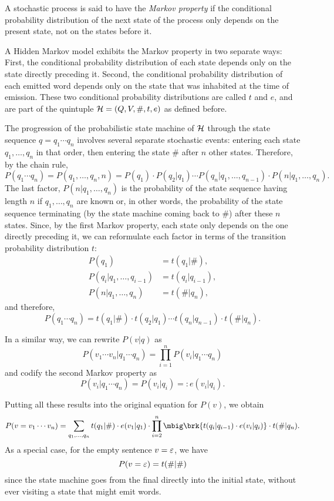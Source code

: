 \begin{definition}
 A stochastic process is said to have the \emph{Markov property} if the
 conditional probability distribution of the next state of the process only
 depends on the present state, not on the states before it.
\end{definition}

A Hidden Markov model exhibits the Markov property in two separate ways: First,
the conditional probability distribution of each state depends only on the
state directly preceding it. Second, the conditional probability distribution
of each emitted word depends only on the state that was inhabited at the time
of emission. These two conditional probability distributions are called $t$ and
$e$, and are part of the quintuple $\mathcal H=(Q,V,\#,t,e)$ as defined before.

The progression of the probabilistic state machine of $\mathcal H$ through the state
sequence $q=q_1\cdots q_n$ involves several separate stochastic events:
entering each state $q_1,\ldots,q_n$ in that order, then entering the state
$\#$ after $n$ other states. Therefore, by the chain rule,
\[
 P(q_1\cdots q_n) = P(q_1,\ldots,q_n,n) = P(q_1) \cdot P(q_2|q_1) \cdots P(q_n|q_1,\ldots,q_{n-1}) \cdot P(n|q_1,\ldots,q_n).
\]
The last factor, $P(n|q_1,\ldots,q_n)$ is the probability of the state sequence
having length $n$ if $q_1,\ldots,q_n$ are known or, in other words, the
probability of the state sequence terminating (by the state machine coming back
to $\#$) after these $n$ states. Since, by the first Markov property, each
state only depends on the one directly preceding it, we can reformulate each
factor in terms of the transition probability distribution $t$:
\begin{align*}
 P(q_1) &= t(q_1|\#), \\
 P(q_i|q_1,\ldots,q_{i-1}) &= t(q_i|q_{i-1}), \\
 P(n|q_1,\ldots,q_n) &= t(\#|q_n),
\end{align*}
and therefore,
\[
 P(q_1\cdots q_n) = t(q_1|\#) \cdot t(q_2|q_1) \cdots t(q_n|q_{n-1}) \cdot t(\#|q_n).
\]

In a similar way, we can rewrite $P(v|q)$ as
\[
 P(v_1\cdots v_n|q_1\cdots q_n) = \prod_{i=1}^n P(v_i|q_1\cdots q_n)
\]
and codify the second Markov property as
\[
 P(v_i|q_1\cdots q_n) = P(v_i|q_i) =: e(v_i|q_i).
\]

Putting all these results into the original equation for $P(v)$, we obtain
\[\label{eq:03-p-v}
 P(v=v_1\cdots v_n) = \sum_{q_1,\ldots,q_n} t(q_1|\#) \cdot e(v_1|q_1) \cdot \prod_{i=2}^n \mbig\brk{t(q_i|q_{i-1}) \cdot e(v_i|q_i)} \cdot t(\#|q_n).
\]
As a special case, for the empty sentence $v=\varepsilon$, we have
\[\label{eq:03-p-v-eps}
 P(v=\varepsilon) = t(\#|\#)
\]
since the state machine goes from the final directly into the initial state,
without ever visiting a state that might emit words.

